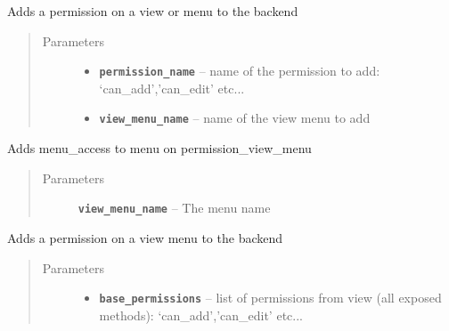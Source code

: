 \documentclass[letterpaper,10pt,english]{sphinxmanual}
\begin{document}
\begin{fulllineitems}
\begin{fulllineitems}
\label{api:flask.ext.appbuilder.security.manager.BaseSecurityManager.add_permission_view_menu}
Adds a permission on a view or menu to the backend
\begin{quote}\begin{description}
\item[{Parameters}] \leavevmode\begin{itemize}
\item {} 
\textbf{\texttt{permission\_name}} -- name of the permission to add: `can\_add','can\_edit' etc...

\item {} 
\textbf{\texttt{view\_menu\_name}} -- name of the view menu to add

\end{itemize}

\end{description}\end{quote}

\end{fulllineitems}


\begin{fulllineitems}
\label{api:flask.ext.appbuilder.security.manager.BaseSecurityManager.add_permissions_menu}
Adds menu\_access to menu on permission\_view\_menu
\begin{quote}\begin{description}
\item[{Parameters}] \leavevmode
\textbf{\texttt{view\_menu\_name}} -- The menu name

\end{description}\end{quote}

\end{fulllineitems}


\begin{fulllineitems}
\label{api:flask.ext.appbuilder.security.manager.BaseSecurityManager.add_permissions_view}
Adds a permission on a view menu to the backend
\begin{quote}\begin{description}
\item[{Parameters}] \leavevmode\begin{itemize}
\item {} 
\textbf{\texttt{base\_permissions}} -- list of permissions from view (all exposed methods): `can\_add','can\_edit' etc...


\end{itemize}
\end{description}
\end{quote}
\end{fulllineitems}
\end{fulllineitems}
\end{document}
